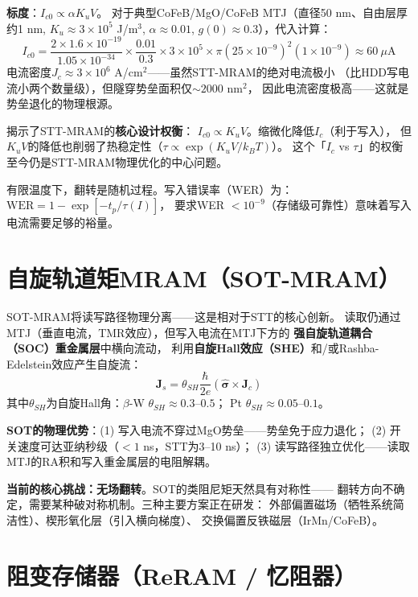 \documentclass[11pt,a4paper,openany]{book}
\theoremstyle{definition}
\theoremstyle{plain}
\theoremstyle{remark}
\begin{document}
\textbf{标度}：$I_{c0} \propto \alpha K_u V$。
对于典型CoFeB/MgO/CoFeB MTJ（直径50 nm、自由层厚约1 nm,
$K_u \approx 3\times 10^5$ J/m$^3$,
$\alpha \approx 0.01$, $g(0) \approx 0.3$），代入计算：
\begin{equation}
  I_{c0} = \frac{2\times 1.6\times 10^{-19}}{1.05\times 10^{-34}}
  \times \frac{0.01}{0.3} \times 3\times 10^5
  \times \pi(25\times 10^{-9})^2 (1\times 10^{-9})
  \approx 60\ \mu\text{A}
\end{equation}
电流密度$J_c \approx 3\times 10^6$ A/cm$^2$——虽然STT-MRAM的绝对电流极小
（比HDD写电流小两个数量级），但隧穿势垒面积仅$\sim 2000$ nm$^2$，
因此电流密度极高——这就是势垒退化的物理根源。

揭示了STT-MRAM的\textbf{核心设计权衡}：
$I_{c0} \propto K_u V$。缩微化降低$I_c$（利于写入），
但$K_u V$的降低也削弱了热稳定性（$\tau \propto \exp(K_u V/k_B T)$）。
这个「$I_c$ vs $\tau$」的权衡至今仍是STT-MRAM物理优化的中心问题。

有限温度下，翻转是随机过程。写入错误率（WER）为：
$\text{WER} = 1 - \exp[-t_p/\tau(I)]$，
要求WER $< 10^{-9}$（存储级可靠性）意味着写入电流需要足够的裕量。

\section{自旋轨道矩MRAM（SOT-MRAM）}

SOT-MRAM将读写路径物理分离——这是相对于STT的核心创新。
读取仍通过MTJ（垂直电流，TMR效应），但写入电流在MTJ下方的
\textbf{强自旋轨道耦合（SOC）重金属层}中横向流动，
利用\textbf{自旋Hall效应（SHE）}和/或Rashba-Edelstein效应产生自旋流：
\begin{equation}\label{eq:she}
  \mathbf{J}_s = \theta_{SH}\frac{\hbar}{2e}(\hat{\boldsymbol{\sigma}}\times\mathbf{J}_c)
\end{equation}
其中$\theta_{SH}$为自旋Hall角：$\beta$-W $\theta_{SH} \approx 0.3$--$0.5$；
Pt $\theta_{SH} \approx 0.05$--$0.1$。

\textbf{SOT的物理优势}：(1) 写入电流不穿过MgO势垒——势垒免于应力退化；
(2) 开关速度可达亚纳秒级（$< 1$ ns，STT为3--10 ns）；
(3) 读写路径独立优化——读取MTJ的RA积和写入重金属层的电阻解耦。

\textbf{当前的核心挑战：无场翻转}。SOT的类阻尼矩天然具有对称性——
翻转方向不确定，需要某种破对称机制。三种主要方案正在研发：
外部偏置磁场（牺牲系统简洁性）、楔形氧化层（引入横向梯度）、
交换偏置反铁磁层（IrMn/CoFeB）。

\section{阻变存储器（ReRAM / 忆阻器）}
\end{document}
